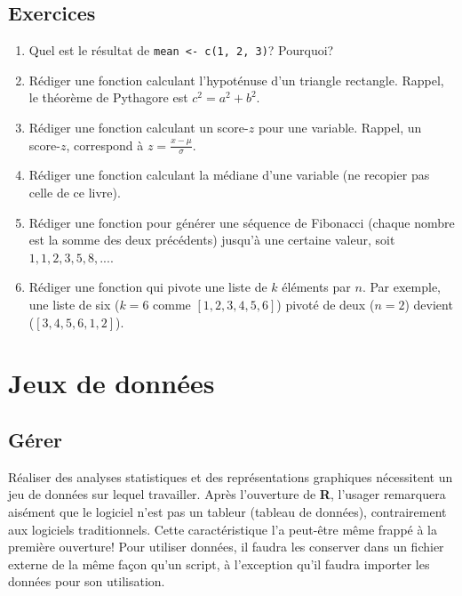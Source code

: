 \documentclass[
]{book}
\providecommand{\tightlist}{%
  \setlength{\itemsep}{0pt}\setlength{\parskip}{0pt}}
\begin{document}
\hypertarget{exercice-rudiments}{%
\chapter*{Exercices}\label{exercice-rudiments}}

\begin{enumerate}
\def\labelenumi{\arabic{enumi}.}
\tightlist
\item
  Quel est le résultat de \texttt{mean\ \textless{}-\ c(1,\ 2,\ 3)}? Pourquoi?
\item
  Rédiger une fonction calculant l'hypoténuse d'un triangle rectangle. Rappel, le théorème de Pythagore est \(c^2=a^2+b^2\).
\item
  Rédiger une fonction calculant un score-\(z\) pour une variable. Rappel, un score-\(z\), correspond à \(z=\frac{x-\mu}{\sigma}\).
\item
  Rédiger une fonction calculant la médiane d'une variable (ne recopier pas celle de ce livre).
\item
  Rédiger une fonction pour générer une séquence de Fibonacci (chaque nombre est la somme des deux précédents) jusqu'à une certaine valeur, soit \(1,1,2,3,5,8,...\).
\item
  Rédiger une fonction qui pivote une liste de \(k\) éléments par \(n\). Par exemple, une liste de six (\(k=6\) comme \([1,2,3,4,5,6]\)) pivoté de deux (\(n=2\)) devient (\([3,4,5,6,1,2]\)).
\end{enumerate}

\hypertarget{part-jeux-de-donnuxe9es}{%
\part{Jeux de données}\label{part-jeux-de-donnuxe9es}}

\hypertarget{guxe9rer}{%
\chapter{Gérer}\label{guxe9rer}}

Réaliser des analyses statistiques et des représentations graphiques nécessitent un jeu de données sur lequel travailler. Après l'ouverture de \textbf{R}, l'usager remarquera aisément que le logiciel n'est pas un tableur (tableau de données), contrairement aux logiciels traditionnels. Cette caractéristique l'a peut-être même frappé à la première ouverture! Pour utiliser données, il faudra les conserver dans un fichier externe de la même façon qu'un script, à l'exception qu'il faudra importer les données pour son utilisation.
\end{document}
